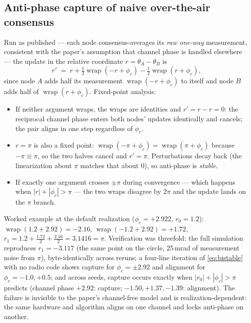 \documentclass[10pt]{article}
\newcommand{\wrapop}{\operatorname{wrap}}
\begin{document}
\subsection{Anti-phase capture of naive over-the-air consensus}
Run as published --- each node consensus-averages its \emph{raw one-way}
measurement, consistent with the paper's assumption that channel phase
is handled elsewhere --- the update in the relative coordinate
$r=\theta_A-\theta_B$ is
\begin{equation}
r' \;=\; r+\tfrac12\wrapop(-r+\phi_c)-\tfrac12\wrapop(r+\phi_c),
\label{eq:bistable}
\end{equation}
since node $A$ adds half its measurement $\wrapop(-r+\phi_c)$ to itself
and node $B$ adds half of $\wrapop(r+\phi_c)$. Fixed-point analysis:
\begin{itemize}
\item If neither argument wraps, the wraps are identities and
$r'=r-r=0$: the reciprocal channel phase enters both nodes' updates
identically and cancels; the pair aligns in one step regardless of
$\phi_c$.
\item $r=\pi$ is also a fixed point: $\wrapop(-\pi+\phi_c)
=\wrapop(\pi+\phi_c)$ because $-\pi\equiv\pi$, so the two halves cancel
and $r'=\pi$. Perturbations decay back (the linearization about $\pi$
matches that about 0), so anti-phase is \emph{stable}.
\item If exactly one argument crosses $\pm\pi$ during convergence ---
which happens when $|r|+|\phi_c|>\pi$ --- the two wraps disagree by
$2\pi$ and the update lands on the $\pi$ branch.
\end{itemize}
Worked example at the default realization ($\phi_c=+2.922$, $r_0=1.2$):
$\wrapop(1.2+2.92)=-2.16$, $\wrapop(-1.2+2.92)=+1.72$,
$r_1=1.2+\tfrac{1.72}{2}+\tfrac{2.16}{2}=3.1416=\pi$. Verification was
threefold: the full simulation reproduces $r_1=-3.117$ (the same point on
the circle, 25\,mrad of measurement noise from $\pi$), byte-identically
across reruns; a four-line iteration of \eqref{eq:bistable} with no radio
code shows capture for $\phi_c=\pm2.92$ and alignment for
$\phi_c=-1.0,+0.5$; and across seeds, capture occurs exactly when
$|r_0|+|\phi_c|>\pi$ predicts (channel phase $+2.92$: capture;
$-1.50,+1.37,-1.39$: alignment). The failure is invisible to the paper's
channel-free model and is realization-dependent: the same hardware and
algorithm aligns on one channel and locks anti-phase on another.
\end{document}
